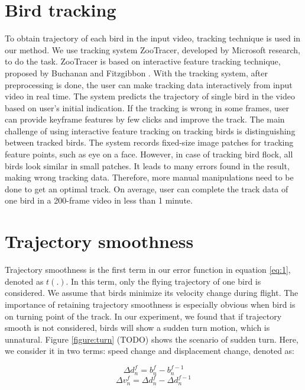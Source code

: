 \section{Bird tracking}


To obtain trajectory of each bird in the input video, tracking technique is used in our method. We use tracking system ZooTracer\cite{ZooTracer}, developed by Microsoft research, to do the task. ZooTracer is based on interactive feature tracking technique, proposed by Buchanan and Fitzgibbon \cite{Tracking}. With the tracking system, after preprocessing is done, the user can make tracking data interactively from input video in real time. The system predicts the trajectory of single bird in the video based on user's initial indication. If the tracking is wrong in some frames, user can provide keyframe features by few clicks and improve the track.
The main challenge of using interactive feature tracking on tracking birds is distinguishing between tracked birds. The system records fixed-size image patches for tracking feature points, such as eye on a face. However, in case of tracking bird flock, all birds look similar in small patches. It leads to many errors found in the result, making wrong tracking data. Therefore, more manual manipulations need to be done to get an optimal track. On average, user can complete the track data of one bird in a 200-frame video in less than 1 minute.



\section{Trajectory smoothness}


Trajectory smoothness is the first term in our error function in equation \ref{eq:1}, denoted as $t(.)$. In this term, only the flying trajectory of one bird is considered. We assume that birds minimize its velocity change during flight. The importance of retaining trajectory smoothness is especially obvious when bird is on turning point of the track. In our experiment, we found that if trajectory smooth is not considered, birds will show a sudden turn motion, which is unnatural. Figure \ref{figure:turn} (TODO) shows the scenario of sudden turn.
Here, we consider it in two terms: speed change and displacement change, denoted as:


\begin{equation}\label{eq:4}
{\Delta}d_n^f = b_n^f-b_n^{f-1}
\end{equation}
\begin{equation}\label{eq:5}
{\Delta}v_n^f = {\Delta}d_n^f-{\Delta}d_n^{f-1}
\end{equation}


